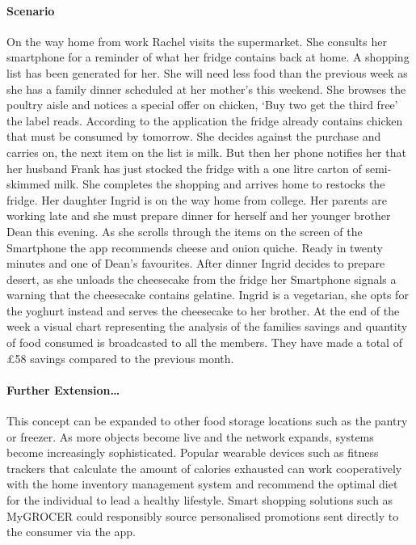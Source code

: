 \documentclass[a4paper, 11pt]{article}
\begin{document}
\paragraph{Scenario}On the way home from work Rachel visits the supermarket. She consults her smartphone for a reminder of what her fridge contains back at home. A shopping list has been generated for her. She will need less food than the previous week as she has a family dinner scheduled at her mother's this weekend. She browses the poultry aisle and notices a special offer on chicken, `Buy two get the third free' the label reads. According to the application the fridge already contains chicken that must be consumed by tomorrow. She decides against the purchase and carries on, the next item on the list is milk. But then her phone notifies her that her husband Frank has just stocked the fridge with a one litre carton of semi-skimmed milk. She completes the shopping and arrives home to restocks the fridge. Her daughter Ingrid is on the way home from college. Her parents are working late and she must prepare dinner for herself and her younger brother Dean this evening. As she scrolls through the items on the screen of the Smartphone the app recommends cheese and onion quiche. Ready in twenty minutes and one of Dean's favourites. After dinner Ingrid decides to prepare desert, as she unloads the cheesecake from the fridge her Smartphone signals a warning that the cheesecake contains gelatine. Ingrid is a vegetarian, she opts for the yoghurt instead and serves the cheesecake to her brother. At the end of the week a visual chart representing the analysis of the families savings and quantity of food consumed is broadcasted to all the members. They have made a total of \pounds58 savings compared to the previous month. 

\paragraph{Further Extension\dots} This concept can be expanded to other food storage locations such as the pantry or freezer. As more objects become live and the network expands, systems become increasingly sophisticated. Popular wearable devices such as fitness trackers that calculate the amount of calories exhausted can work cooperatively with the home inventory management system and recommend the optimal diet for the individual to lead a healthy lifestyle. Smart shopping solutions such as MyGROCER\cite{myGrocer} could responsibly source personalised promotions sent directly to the consumer via the app.
\end{document}

